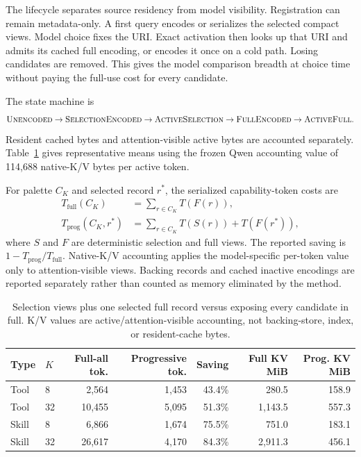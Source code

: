 \documentclass[11pt]{article}
\begin{document}
The lifecycle separates source residency from model visibility. Registration
can remain metadata-only. A first query encodes or serializes the selected
compact views. Model choice fixes the URI. Exact activation then looks up that
URI and admits its cached full encoding, or encodes it once on a cold path.
Losing candidates are removed. This gives the model comparison breadth at
choice time without paying the full-use cost for every candidate.

The state machine is
\[
\textsc{Unencoded}\rightarrow\textsc{SelectionEncoded}
\rightarrow\textsc{ActiveSelection}\rightarrow\textsc{FullEncoded}
\rightarrow\textsc{ActiveFull}.
\]
Resident cached bytes and attention-visible active bytes are accounted
separately. Table~\ref{tab:progressive-accounting} gives representative means
using the frozen Qwen accounting value of 114,688 native-K/V bytes per active
token.

For palette $C_K$ and selected record $r^*$, the serialized capability-token
costs are
\begin{align}
T_{\mathrm{full}}(C_K)&=\sum_{r\in C_K}T(F(r)),\\
T_{\mathrm{prog}}(C_K,r^*)&=\sum_{r\in C_K}T(S(r))+T(F(r^*)),
\end{align}
where $S$ and $F$ are deterministic selection and full views. The reported
saving is $1-T_{\mathrm{prog}}/T_{\mathrm{full}}$. Native-K/V accounting
applies the model-specific per-token value only to attention-visible views.
Backing records and cached inactive encodings are reported separately rather
than counted as memory eliminated by the method.

\begin{table}[t]
\centering
\small
\begin{tabular}{@{}llrrrrr@{}}
\toprule
Type & $K$ & Full-all tok. & Progressive tok. & Saving & Full KV MiB & Prog. KV MiB \\
\midrule
Tool & 8  & 2,564 & 1,453 & 43.4\% & 280.5 & 158.9 \\
Tool & 32 & 10,455 & 5,095 & 51.3\% & 1,143.5 & 557.3 \\
Skill & 8  & 6,866 & 1,674 & 75.5\% & 751.0 & 183.1 \\
Skill & 32 & 26,617 & 4,170 & 84.3\% & 2,911.3 & 456.1 \\
\bottomrule
\end{tabular}
\caption{Selection views plus one selected full record versus exposing every
candidate in full. K/V values are active/attention-visible accounting, not
backing-store, index, or resident-cache bytes.}
\label{tab:progressive-accounting}
\end{table}
\end{document}

